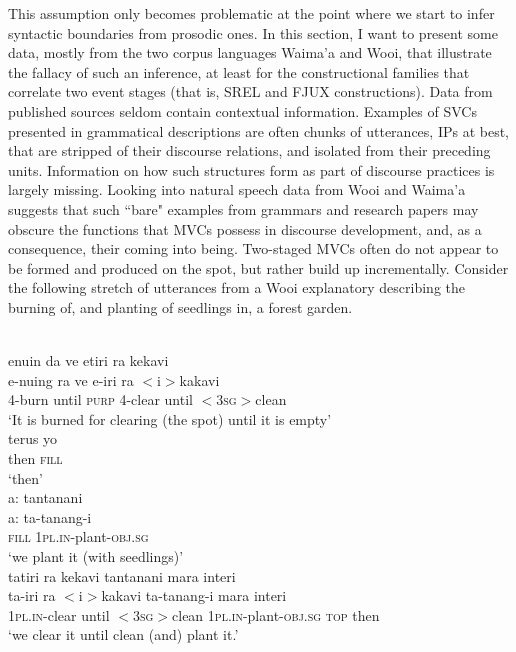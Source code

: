 This assumption only becomes problematic at the point where we start to infer syntactic boundaries from prosodic ones. In this section, I want to present some data, mostly from the two corpus languages Waima'a and Wooi, that illustrate the fallacy of such an inference, at least for the constructional families that correlate two event stages (that is, SREL and FJUX constructions). Data from published sources seldom contain contextual information. Examples of SVCs presented in grammatical descriptions are often chunks of utterances, IPs at best, that are stripped of their discourse relations, and isolated from their preceding units. Information on how such structures form as part of discourse practices is largely missing. Looking into natural speech data from Wooi and Waima'a suggests that such ``bare" examples from grammars and research papers may obscure the functions that MVCs possess in discourse development, and, as a consequence, their coming into being. Two-staged MVCs often do not appear to be formed and produced on the spot, but rather build up incrementally. Consider the following stretch of utterances from a Wooi explanatory describing the burning of, and planting of seedlings in, a forest garden.  

\ea \label{Wooi_gardening1}
\\
\ea 
\glll enuin da ve etiri ra kekavi \\
e-nuing ra ve e-iri ra $<$i$>$kakavi \\
\textsc{4}-burn until \textsc{purp} \textsc{4}-clear until $<$\textsc{3}\textsc{sg}$>$clean \\
\glft `It is burned for clearing (the spot) until it is empty' \\ 
\ex
\gll terus yo \\
then \textsc{fill} \\
\glft `then' \\ 
\ex
\glll a: tantanani \\
a: ta-tanang-i \\
\textsc{fill} \textsc{1}\textsc{pl}.\textsc{in}-plant-\textsc{obj}.\textsc{sg} \\
\glft `we plant it (with seedlings)' \\ 
\ex
\glll tatiri ra kekavi tantanani mara interi \\ 
ta-iri ra $<$i$>$kakavi ta-tanang-i mara interi \\
\textsc{1}\textsc{pl}.\textsc{in}-clear until $<$\textsc{3}\textsc{sg}$>$clean \textsc{1}\textsc{pl}.\textsc{in}-plant-\textsc{obj}.\textsc{sg} \textsc{top} then \\
\glft `we clear it until clean (and) plant it.'\\ 
\z
\z

